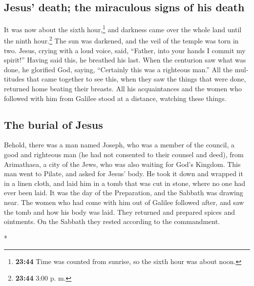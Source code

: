 \begin{paracol}{2}
\begin{otherlanguage}{english}
\begin{otherlanguage}{english}
\hypertarget{jesus-death-the-miraculous-signs-of-his-death}{%
\subsection{Jesus' death; the miraculous signs of his
death}\label{jesus-death-the-miraculous-signs-of-his-death}}

 It was now about the sixth hour,\footnote{\textbf{23:44}
  Time was counted from sunrise, so the sixth hour was about noon.} and
darkness came over the whole land until the ninth hour.\footnote{\textbf{23:44}
  3:00 p. m.}  The sun was darkened, and the veil of the
temple was torn in two.  Jesus, crying with a loud voice,
said, ``Father, into your hands I commit my spirit!'' Having said this,
he breathed his last.  When the centurion saw what was
done, he glorified God, saying, ``Certainly this was a righteous man.''
 All the multitudes that came together to see this, when
they saw the things that were done, returned home beating their breasts.
 All his acquaintances and the women who followed with
him from Galilee stood at a distance, watching these things.

\hypertarget{the-burial-of-jesus}{%
\subsection{The burial of Jesus}\label{the-burial-of-jesus}}

 Behold, there was a man named Joseph, who was a member
of the council, a good and righteous man  (he had not
consented to their counsel and deed), from Arimathaea, a city of the
Jews, who was also waiting for God's Kingdom.  This man
went to Pilate, and asked for Jesus' body.  He took it
down and wrapped it in a linen cloth, and laid him in a tomb that was
cut in stone, where no one had ever been laid.  It was
the day of the Preparation, and the Sabbath was drawing near.
 The women who had come with him out of Galilee followed
after, and saw the tomb and how his body was laid.  They
returned and prepared spices and ointments. On the Sabbath they rested
according to the commandment.

\end{otherlanguage}

\switchcolumn[0]*

\hypertarget{descubrimiento-de-la-tumba-vacuxeda-en-la-mauxf1ana-de-pascua-la-revelaciuxf3n-a-las-mujeres}{%
}
\end{otherlanguage}
\end{paracol}
